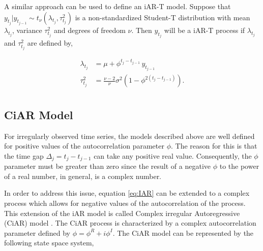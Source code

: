 A similar approach can be used to define an iAR-T model. Suppose that \(y_{t_j}|y_{t_{j-1}} \sim t_{\nu}(\lambda_{t_j},\tau_{t_j}^2)\) is a non-standardized Student-T distribution with mean \(\lambda_{t_j}\), variance \(\tau_{t_j}^2\) and degrees of freedom \(\nu\). Then \(y_{t_j}\) will be a iAR-T process if \(\lambda_{t_j}\) and \(\tau_{t_j}^2\) are defined by,

\begin{equation}
\begin{split}
\lambda_{t_j} &= \mu + \phi^{t_j-t_{j-1}} \, y_{t_{j-1}}\\
\tau_{t_j}^2 &= \frac{\nu-2}{\nu}\sigma^2 \left(1-\phi^{2(t_j-t_{j-1})}\right).\\
\end{split}
\label{eq:IART}
\end{equation}

\subsection{CiAR Model}\label{ciar-model}

For irregularly observed time series, the models described above are well defined for positive values of the autocorrelation parameter \(\phi\). The reason for this is that the time gap \(\Delta_j = t_j-t_{j-1}\) can take any positive real value. Consequently, the \(\phi\) parameter must be greater than zero since the result of a negative \(\phi\) to the power of a real number, in general, is a complex number.

In order to address this issue, equation \eqref{eq:IAR} can be extended to a complex process which allows for negative values of the autocorrelation of the process. This extension of the iAR model is called Complex irregular Autoregressive (CiAR) model \citep{Elorrieta_2019}. The CiAR process is characterized by a complex autocorrelation parameter defined by \(\phi= \phi^R + i \phi^I\). The CiAR model can be represented by the following state space system,

